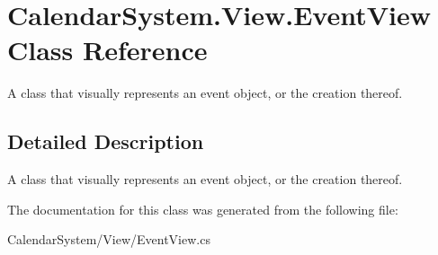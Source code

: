 \hypertarget{class_calendar_system_1_1_view_1_1_event_view}{\section{Calendar\+System.\+View.\+Event\+View Class Reference}
\label{class_calendar_system_1_1_view_1_1_event_view}
}


A class that visually represents an event object, or the creation thereof.  




\subsection{Detailed Description}
A class that visually represents an event object, or the creation thereof. 



The documentation for this class was generated from the following file\+:\begin{DoxyCompactItemize}
\item 
Calendar\+System/\+View/Event\+View.\+cs\end{DoxyCompactItemize}

